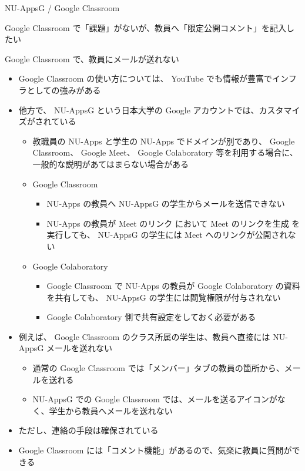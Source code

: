 \documentclass[a4j,10pt]{jsarticle}
\begin{document}
{\begin{frame}[label={sec:org25495ab},fragile]{NU-AppsG / Google Classroom}
\begin{block}{Google Classroom で「課題」がないが、教員へ「限定公開コメント」を記入したい}
\begin{itemize}
\begin{itemize}
\end{itemize}
\end{itemize}
\end{block}
\par
\begin{block}{Google Classroom で、教員にメールが送れない}
\begin{itemize}
\item Google Classroom の使い方については、 YouTube でも情報が豊富でインフラとしての強みがある
\item 他方で、 NU-AppsG という日本大学の Google アカウントでは、カスタマイズがされている
\begin{itemize}
\item 教職員の NU-Apps と学生の NU-Apps でドメインが別であり、 Google Classroom、 Google Meet、 Google Colaboratory 等を利用する場合に、一般的な説明があてはまらない場合がある
\item Google Classroom
\begin{itemize}
\item NU-Apps の教員へ  NU-AppsG の学生からメールを送信できない
\item NU-Apps の教員が \alert{Meet のリンク} において \alert{Meet のリンクを生成} を実行しても、 NU-AppsG の学生には Meet へのリンクが公開されない
\end{itemize}
\item Google Colaboratory
\begin{itemize}
\item Google Classroom で NU-Apps の教員が Google Colaboratory の資料を共有しても、 NU-AppsG の学生には閲覧権限が付与されない
\item Google Colaboratory 側で共有設定をしておく必要がある
\end{itemize}
\end{itemize}
\item 例えば、 Google Classroom のクラス所属の学生は、教員へ直接には NU-AppsG メールを送れない
\begin{itemize}
\item 通常の Google Classroom では「メンバー」タブの教員の箇所から、メールを送れる
\item NU-AppsG での Google Classroom では、メールを送るアイコンがなく、学生から教員へメールを送れない
\end{itemize}
\par
\item ただし、連絡の手段は確保されている
\item Google Classroom には「コメント機能」があるので、気楽に教員に質問ができる

\end{itemize}
\end{block}
\end{frame}}
\end{document}

